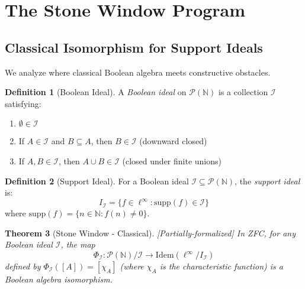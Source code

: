\documentclass[11pt]{article}
\theoremstyle{plain}
\newtheorem{theorem}{Theorem}[section]
\theoremstyle{definition}
\newtheorem{definition}[theorem]{Definition}
\newcommand{\N}{\mathbb{N}}
\newcommand{\linf}{\ell^\infty}
\newcommand{\leanpartial}{\textsf{\textcolor{purple!70!black}{[Partially-formalized]}}}
\begin{document}
\section{The Stone Window Program}

\subsection{Classical Isomorphism for Support Ideals}

We analyze where classical Boolean algebra meets constructive obstacles.

\begin{definition}[Boolean Ideal]\label{def:bool-ideal}
A \emph{Boolean ideal} on $\mathcal{P}(\N)$ is a collection $\mathcal{I}$ satisfying:
\begin{enumerate}
\item $\emptyset \in \mathcal{I}$
\item If $A \in \mathcal{I}$ and $B \subseteq A$, then $B \in \mathcal{I}$ (downward closed)
\item If $A, B \in \mathcal{I}$, then $A \cup B \in \mathcal{I}$ (closed under finite unions)
\end{enumerate}
\end{definition}

\begin{definition}[Support Ideal]\label{def:support-ideal}
For a Boolean ideal $\mathcal{I} \subseteq \mathcal{P}(\N)$, the \emph{support ideal} is:
\[
I_{\mathcal{I}} = \{f \in \linf : \text{supp}(f) \in \mathcal{I}\}
\]
where $\text{supp}(f) = \{n \in \N : f(n) \neq 0\}$.
\end{definition}

\begin{theorem}[Stone Window - Classical]\label{thm:stone-classical} \leanpartial
In ZFC, for any Boolean ideal $\mathcal{I}$, the map
\[
\Phi_{\mathcal{I}}: \mathcal{P}(\N)/\mathcal{I} \to \text{Idem}(\linf/I_{\mathcal{I}})
\]
defined by $\Phi_{\mathcal{I}}([A]) = [\chi_A]$ (where $\chi_A$ is the characteristic function) is a Boolean algebra isomorphism.
\end{theorem}
\end{document}
